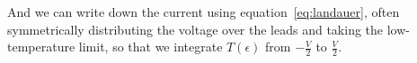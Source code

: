 And we can write down the current using equation~\ref{eq:landauer}, often symmetrically distributing the voltage over the leads and taking the low-temperature limit, so that we integrate $T(\epsilon)$ from $-\frac{V}{2}$ to $\frac{V}{2}$. 



